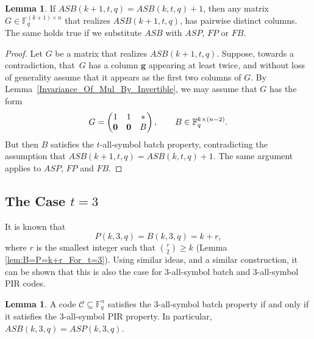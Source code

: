\documentclass[11pt,a4paper]{article}
\theoremstyle{definition}
\newtheorem{lemma}[theorem]{Lemma}
\newcommand{\bfg}{{\boldsymbol g}}
\newcommand{\F}{\mathbb{F}}
\begin{document}
\begin{lemma}\label{lemma:jump_repeated}
    If $ASB(k+1,t,q)=ASB(k,t,q)+1$, then any matrix $G\in \F_q^{(k+1) \times n}$ that realizes $ASB(k+1,t,q)$, has pairwise distinct columns. The same holds true if we substitute $ASB$ with $ASP$, $FP$ or $FB$.
\end{lemma}
\begin{proof}
    Let $G$ be a matrix that realizes $ASB(k+1,t,q)$. Suppose, towards a contradiction, that~$G$ has a column $\bfg$ appearing at least twice, and without loss of generality assume that it appears as the first two columns of $G$. By Lemma~\ref{Invariance_Of_Mul_By_Invertible}, we may assume that $G$ has the form
    \[
        G=
        \begin{pmatrix}
        1 & 1 & *\\
        \bf0 & \bf0 & B
        \end{pmatrix},
        \qquad
        B\in\mathbb{F}_q^{k\times (n-2)}.
    \]
    But then $B$ satisfies the $t$-all-symbol batch property, contradicting the assumption that $ASB(k+1,t,q)=ASB(k,t,q)+1$. The same argument applies to $ASP$, $FP$ and $FB$.
\end{proof}

\subsection{The Case $t=3$} \label{subsec:t3}

It is known that
$$
    P(k,3,q) = B(k,3,q) = k + r,
$$
where $r$ is the smallest integer such that $\binom{r}{2} \geq k$ (Lemma \ref{lem:B=P=k+r_For_t=3}). Using similar ideas, and a similar construction, it can be shown that this is also the case for 3-all-symbol batch and 3-all-symbol PIR codes.

\begin{lemma}\label{lemma:t=3_pir_iff_batch}
    A code $\mathcal{C}\subseteq \F_q^n$ satisfies the $3$-all-symbol batch property if and only if it satisfies the $3$-all-symbol PIR property. In particular, $ASB(k,3,q) = ASP(k,3,q)$.
\end{lemma}
\end{document}
